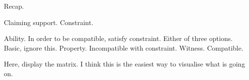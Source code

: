 \begin{note}
  Recap.

  Claiming support.
  Constraint.

  Ability.
  In order to be compatible, satisfy constraint.
  Either of three options.
  Basic, ignore this.
  Property. Incompatible with constraint.
  Witness. Compatible.

  Here, display the matrix.
  I think this is the easiest way to visualise what is going on.
\end{note}


